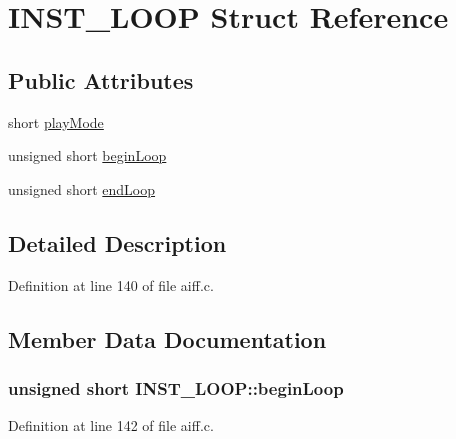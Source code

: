 \hypertarget{struct_i_n_s_t___l_o_o_p}{}\section{I\+N\+S\+T\+\_\+\+L\+O\+OP Struct Reference}
\label{struct_i_n_s_t___l_o_o_p}
\subsection*{Public Attributes}
\begin{DoxyCompactItemize}
\item 
short \hyperlink{struct_i_n_s_t___l_o_o_p_ae87d0ed027ed2a3cd884689366d79da2}{play\+Mode}
\item 
unsigned short \hyperlink{struct_i_n_s_t___l_o_o_p_a426d8594f403746cf1626819cc63d2ad}{begin\+Loop}
\item 
unsigned short \hyperlink{struct_i_n_s_t___l_o_o_p_ab6d8a9dfdd0c0d6ae14139aa918a509c}{end\+Loop}
\end{DoxyCompactItemize}


\subsection{Detailed Description}


Definition at line 140 of file aiff.\+c.



\subsection{Member Data Documentation}
\subsubsection[{\texorpdfstring{begin\+Loop}{beginLoop}}]{\setlength{\rightskip}{0pt plus 5cm}unsigned short I\+N\+S\+T\+\_\+\+L\+O\+O\+P\+::begin\+Loop}\hypertarget{struct_i_n_s_t___l_o_o_p_a426d8594f403746cf1626819cc63d2ad}{}\label{struct_i_n_s_t___l_o_o_p_a426d8594f403746cf1626819cc63d2ad}


Definition at line 142 of file aiff.\+c.

